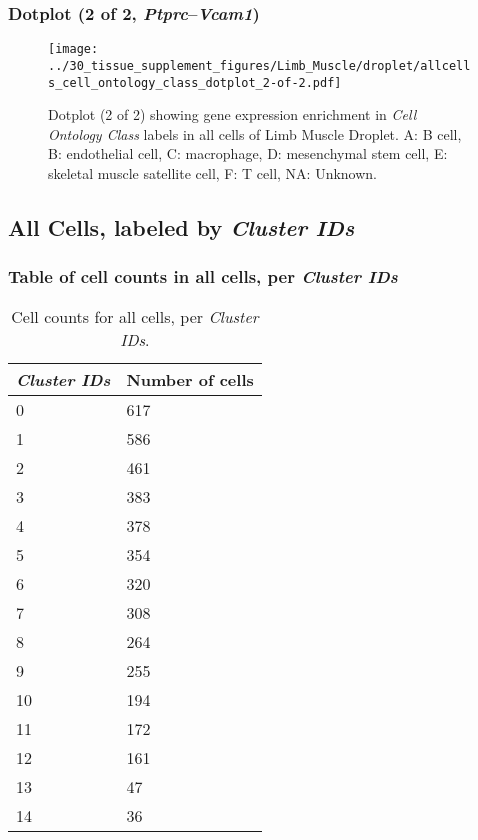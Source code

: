 \clearpage

\subsubsection{Dotplot (2 of 2, \emph{Ptprc}--\emph{Vcam1})}
\begin{figure}[h]
\centering
\texttt{[image: ../30\_tissue\_supplement\_figures/Limb\_Muscle/droplet/allcells\_cell\_ontology\_class\_dotplot\_2-of-2.pdf]}

\caption{ Dotplot (2 of 2)  showing gene expression enrichment in \emph{Cell Ontology Class} labels in all cells of Limb Muscle Droplet. A: B cell, B: endothelial cell, C: macrophage, D: mesenchymal stem cell, E: skeletal muscle satellite cell, F: T cell, NA: Unknown.}
\end{figure}


\clearpage

\subsection{All Cells, labeled by \emph{Cluster IDs}}
\subsubsection{Table of cell counts in all cells, per \emph{Cluster IDs}}\begin{table}[h]
\centering
\label{my-label}
\begin{tabular}{@{}ll@{}}
\toprule

\emph{Cluster IDs}& Number of cells \\ \midrule
0 & 617 \\

1 & 586 \\

2 & 461 \\

3 & 383 \\

4 & 378 \\

5 & 354 \\

6 & 320 \\

7 & 308 \\

8 & 264 \\

9 & 255 \\

10 & 194 \\

11 & 172 \\

12 & 161 \\

13 & 47 \\

14 & 36 \\
\bottomrule
\end{tabular}
\caption{Cell counts for all cells, per \emph{Cluster IDs}.}
\end{table}

